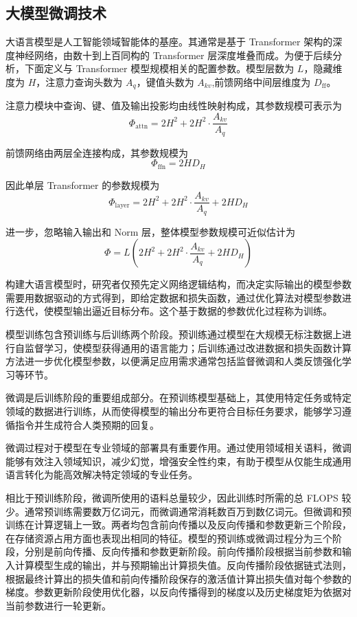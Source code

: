 \documentclass[bachelor,openany,oneside,color,AutoFakeBold=true]{buaathesis}
\begin{document}
\subsection{大模型微调技术}
大语言模型是人工智能领域智能体的基座。其通常是基于 Transformer 架构的深度神经网络，由数十到上百同构的 Transformer 层深度堆叠而成。为便于后续分析，下面定义与 Transformer 模型规模相关的配置参数。模型层数为 $L$，隐藏维度为 $H$，注意力查询头数为 $A_q$，键值头数为 $A_{kv}$,前馈网络中间层维度为 $D_{\mathrm{ff}}$。

注意力模块中查询、键、值及输出投影均由线性映射构成，其参数规模可表示为
\[
\Phi_{\mathrm{attn}} =
2H^2 + 2H^2 \cdot \frac{A_{kv}}{A_q}
\]

前馈网络由两层全连接构成，其参数规模为
\[
\Phi_{\mathrm{ffn}} = 2H D_H
\]

因此单层 Transformer 的参数规模为
\[
\Phi_{\mathrm{layer}} =
2H^2 + 2H^2 \cdot \frac{A_{kv}}{A_q} + 2H D_H
\]

进一步，忽略输入输出和 Norm 层，整体模型参数规模可近似估计为
\[
\Phi = L\left(2H^2 + 2H^2 \cdot \frac{A_{kv}}{A_q} + 2H D_H\right)
\]



构建大语言模型时，研究者仅预先定义网络逻辑结构，而决定实际输出的模型参数需要用数据驱动的方式得到，即给定数据和损失函数，通过优化算法对模型参数进行迭代，使模型输出逼近目标分布。这个基于数据的参数优化过程称为训练。

模型训练包含预训练与后训练两个阶段。预训练通过模型在大规模无标注数据上进行自监督学习，使模型获得通用的语言能力；后训练通过改进数据和损失函数计算方法进一步优化模型参数，以便满足应用需求通常包括监督微调和人类反馈强化学习等环节。

微调是后训练阶段的重要组成部分。在预训练模型基础上，其使用特定任务或特定领域的数据进行训练，从而使得模型的输出分布更符合目标任务要求，能够学习遵循指令并生成符合人类预期的回复。

微调过程对于模型在专业领域的部署具有重要作用。通过使用领域相关语料，微调能够有效注入领域知识，减少幻觉，增强安全性约束，有助于模型从仅能生成通用语言转化为能高效解决特定领域的专业任务。

相比于预训练阶段，微调所使用的语料总量较少，因此训练时所需的总 FLOPS 较少。通常预训练需要数万亿词元，而微调通常消耗数百万到数亿词元。但微调和预训练在计算逻辑上一致。两者均包含前向传播以及反向传播和参数更新三个阶段，在存储资源占用方面也表现出相同的特征。模型的预训练或微调过程分为三个阶段，分别是前向传播、反向传播和参数更新阶段。前向传播阶段根据当前参数和输入计算模型生成的输出，并与预期输出计算损失值。反向传播阶段依据链式法则，根据最终计算出的损失值和前向传播阶段保存的激活值计算出损失值对每个参数的梯度。参数更新阶段使用优化器，以反向传播得到的梯度以及历史梯度矩为依据对当前参数进行一轮更新。
\end{document}
